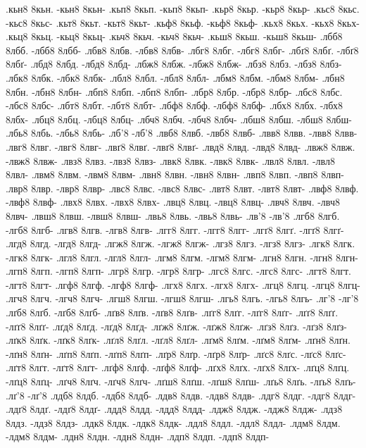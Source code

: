 {.кьн8 8кьн. -кьн8 8кьн-
.кьп8 8кьп. -кьп8 8кьп-
.кьр8 8кьр. -кьр8 8кьр-
.кьс8 8кьс. -кьс8 8кьс-
.кьт8 8кьт. -кьт8 8кьт-
.кьф8 8кьф. -кьф8 8кьф-
.кьх8 8кьх. -кьх8 8кьх-
.кьц8 8кьц. -кьц8 8кьц-
.кьч8 8кьч. -кьч8 8кьч-
.кьш8 8кьш. -кьш8 8кьш-
.лбб8 8лбб. -лбб8 8лбб-
.лбв8 8лбв. -лбв8 8лбв-
.лбг8 8лбг. -лбг8 8лбг-
.лбґ8 8лбґ. -лбґ8 8лбґ-
.лбд8 8лбд. -лбд8 8лбд-
.лбж8 8лбж. -лбж8 8лбж-
.лбз8 8лбз. -лбз8 8лбз-
.лбк8 8лбк. -лбк8 8лбк-
.лбл8 8лбл. -лбл8 8лбл-
.лбм8 8лбм. -лбм8 8лбм-
.лбн8 8лбн. -лбн8 8лбн-
.лбп8 8лбп. -лбп8 8лбп-
.лбр8 8лбр. -лбр8 8лбр-
.лбс8 8лбс. -лбс8 8лбс-
.лбт8 8лбт. -лбт8 8лбт-
.лбф8 8лбф. -лбф8 8лбф-
.лбх8 8лбх. -лбх8 8лбх-
.лбц8 8лбц. -лбц8 8лбц-
.лбч8 8лбч. -лбч8 8лбч-
.лбш8 8лбш. -лбш8 8лбш-
.лбь8 8лбь. -лбь8 8лбь-
.лб'8 -лб'8
.лвб8 8лвб. -лвб8 8лвб-
.лвв8 8лвв. -лвв8 8лвв-
.лвг8 8лвг. -лвг8 8лвг-
.лвґ8 8лвґ. -лвґ8 8лвґ-
.лвд8 8лвд. -лвд8 8лвд-
.лвж8 8лвж. -лвж8 8лвж-
.лвз8 8лвз. -лвз8 8лвз-
.лвк8 8лвк. -лвк8 8лвк-
.лвл8 8лвл. -лвл8 8лвл-
.лвм8 8лвм. -лвм8 8лвм-
.лвн8 8лвн. -лвн8 8лвн-
.лвп8 8лвп. -лвп8 8лвп-
.лвр8 8лвр. -лвр8 8лвр-
.лвс8 8лвс. -лвс8 8лвс-
.лвт8 8лвт. -лвт8 8лвт-
.лвф8 8лвф. -лвф8 8лвф-
.лвх8 8лвх. -лвх8 8лвх-
.лвц8 8лвц. -лвц8 8лвц-
.лвч8 8лвч. -лвч8 8лвч-
.лвш8 8лвш. -лвш8 8лвш-
.лвь8 8лвь. -лвь8 8лвь-
.лв'8 -лв'8
.лгб8 8лгб. -лгб8 8лгб-
.лгв8 8лгв. -лгв8 8лгв-
.лгг8 8лгг. -лгг8 8лгг-
.лгґ8 8лгґ. -лгґ8 8лгґ-
.лгд8 8лгд. -лгд8 8лгд-
.лгж8 8лгж. -лгж8 8лгж-
.лгз8 8лгз. -лгз8 8лгз-
.лгк8 8лгк. -лгк8 8лгк-
.лгл8 8лгл. -лгл8 8лгл-
.лгм8 8лгм. -лгм8 8лгм-
.лгн8 8лгн. -лгн8 8лгн-
.лгп8 8лгп. -лгп8 8лгп-
.лгр8 8лгр. -лгр8 8лгр-
.лгс8 8лгс. -лгс8 8лгс-
.лгт8 8лгт. -лгт8 8лгт-
.лгф8 8лгф. -лгф8 8лгф-
.лгх8 8лгх. -лгх8 8лгх-
.лгц8 8лгц. -лгц8 8лгц-
.лгч8 8лгч. -лгч8 8лгч-
.лгш8 8лгш. -лгш8 8лгш-
.лгь8 8лгь. -лгь8 8лгь-
.лг'8 -лг'8
.лґб8 8лґб. -лґб8 8лґб-
.лґв8 8лґв. -лґв8 8лґв-
.лґг8 8лґг. -лґг8 8лґг-
.лґґ8 8лґґ. -лґґ8 8лґґ-
.лґд8 8лґд. -лґд8 8лґд-
.лґж8 8лґж. -лґж8 8лґж-
.лґз8 8лґз. -лґз8 8лґз-
.лґк8 8лґк. -лґк8 8лґк-
.лґл8 8лґл. -лґл8 8лґл-
.лґм8 8лґм. -лґм8 8лґм-
.лґн8 8лґн. -лґн8 8лґн-
.лґп8 8лґп. -лґп8 8лґп-
.лґр8 8лґр. -лґр8 8лґр-
.лґс8 8лґс. -лґс8 8лґс-
.лґт8 8лґт. -лґт8 8лґт-
.лґф8 8лґф. -лґф8 8лґф-
.лґх8 8лґх. -лґх8 8лґх-
.лґц8 8лґц. -лґц8 8лґц-
.лґч8 8лґч. -лґч8 8лґч-
.лґш8 8лґш. -лґш8 8лґш-
.лґь8 8лґь. -лґь8 8лґь-
.лґ'8 -лґ'8
.лдб8 8лдб. -лдб8 8лдб-
.лдв8 8лдв. -лдв8 8лдв-
.лдг8 8лдг. -лдг8 8лдг-
.лдґ8 8лдґ. -лдґ8 8лдґ-
.лдд8 8лдд. -лдд8 8лдд-
.лдж8 8лдж. -лдж8 8лдж-
.лдз8 8лдз. -лдз8 8лдз-
.лдк8 8лдк. -лдк8 8лдк-
.лдл8 8лдл. -лдл8 8лдл-
.лдм8 8лдм. -лдм8 8лдм-
.лдн8 8лдн. -лдн8 8лдн-
.лдп8 8лдп. -лдп8 8лдп-
}
